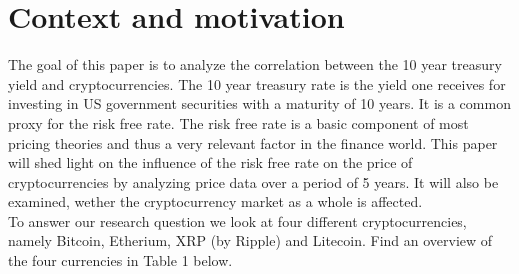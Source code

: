 \documentclass[11pt]{article}
\begin{document}

\pagebreak{}


\setcounter{page}{1}
\section{Context and motivation}


The goal of this paper is to analyze the correlation between the 10 year treasury yield and cryptocurrencies. The 10 year treasury rate is the yield one receives for investing in US government securities with a maturity of 10 years. It is a common proxy for the risk free rate. The risk free rate is a basic component of most pricing theories and thus a very relevant factor in the finance world. This paper will shed light on the influence of the risk free rate on the price of cryptocurrencies by analyzing price data over a period of 5 years. It will also be examined, wether the cryptocurrency market as a whole is affected.
\\

To answer our research question we look at four different cryptocurrencies, namely Bitcoin, Etherium,  XRP (by Ripple) and Litecoin. Find an overview of the four currencies in Table 1 below.
\end{document}
